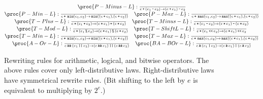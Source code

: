\begin{figure*}[htbp!]
\[
\begin{matrix}
\proc{P-Minus-L}:{\over
e \lp \p{e_1 \lm e_2} \rightarrow \p{e \lp e_1 } \lm e_2
}\\
\proc{P-Min-L}:{\over
e \lp \LMIN\p{e_1, e_2} \rightarrow \LMIN\p{\p{e \lp e_1}, \p{e \lp e_2}}
}\quad
\proc{P-Max-L}:{\over
e \lp \LMAX\p{e_1, e_2} \rightarrow \LMAX\p{\p{e \lp e_1}, \p{e \lp e_2}}
}\\
\proc{T-Plus-L}:{\over
e \lt \p{e_1 \lp e_2} \rightarrow \p{ e \lt e_1 } \lp \p{ e \lt e_2 }
}\quad
\proc{T-Minus-L}:{\over
e \lt \p{e_1 \lm e_2} \rightarrow \p{ e\lt e_1 } \lm \p{ e \lt e_2 }
}\\
\proc{T-Mod-L}:{\over
e \lt \p{e_1 \lmod e_2}\rightarrow \p{ e \lt e_1 } \lmod \p{ e \lt e_2 }
}\quad
\proc{T-ShiftL-L}:{\over
e \lt \p{e_1 \LBSL e_2} \rightarrow \p{ e \lt e_1 } \LBSL e_2
}\\
\proc{T-Min-L}:{\over
e \lt \LMIN\p{e_1, e_2} \rightarrow \LMIN\p{\p{e \lt e_1}, \p{e \lt e_2}}
}\quad
\proc{T-Max-L}:{\over
e \lt \LMAX\p{e_1, e_2} \rightarrow \LMAX\p{\p{e \lt e_1}, \p{e \lt e_2}}
}\\
\proc{A-Or-L}:{\over
e \LAND \p{e_1 \LOR e_2}\rightarrow \p{ e \LAND e_1 } \LOR \p{ e \LAND e_2 }
}\quad
\proc{BA-BOr-L}:{\over
e \LBAND \p{e_1 \LBOR e_2}\rightarrow \p{ e \LBAND e_1 } \LBOR \p{ e \LBAND e_2
}
}
\end{matrix}
\]
\caption[]{Rewriting rules for arithmetic, logical, and bitwise operators. The
above rules cover only left-distributive laws. Right-distributive laws have
symmetrical rewrite rules. (Bit shifting to the left by $e$ is equivalent to
multiplying by $2^e$.)}
\label{figure:rewriting}
\end{figure*}



